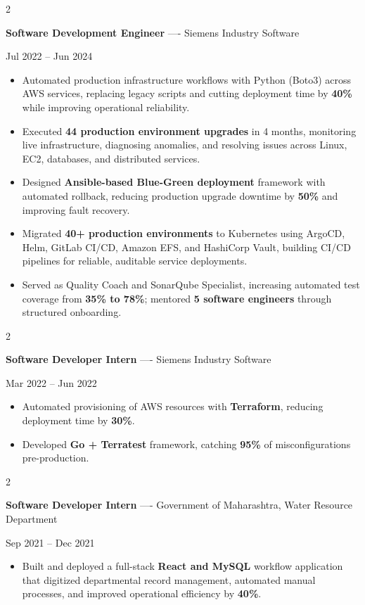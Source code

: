 \documentclass[10pt, letterpaper]{article}
\newenvironment{highlights}{
    \begin{itemize}[
        topsep=0.10 cm,
        parsep=0.06 cm,
        partopsep=0pt,
        itemsep=0.06 cm,
        leftmargin=12pt
    ]
}{
    \end{itemize}
}
\newenvironment{twocolentry}[2][]{
    \onecolentry
    \def\secondColumn{#2}
    \setcolumnwidth{\fill, 4.5 cm}
    \begin{paracol}{2}
}{
    \switchcolumn \raggedleft \secondColumn
    \end{paracol}
    \endonecolentry
}
\begin{document}
\vspace{0.15 cm}

\begin{twocolentry}{Jul 2022 -- Jun 2024}
\textbf{Software Development Engineer} ---- Siemens Industry Software
\end{twocolentry}
\begin{highlights}
  \item Automated production infrastructure workflows with Python (Boto3) across AWS services, replacing legacy scripts and cutting deployment time by \textbf{40\%} while improving operational reliability.
  \item Executed \textbf{44 production environment upgrades} in 4 months, monitoring live infrastructure, diagnosing anomalies, and resolving issues across Linux, EC2, databases, and distributed services.
  \item Designed \textbf{Ansible-based Blue-Green deployment} framework with automated rollback, reducing production upgrade downtime by \textbf{50\%} and improving fault recovery.
  \item Migrated \textbf{40+ production environments} to Kubernetes using ArgoCD, Helm, GitLab CI/CD, Amazon EFS, and HashiCorp Vault, building CI/CD pipelines for reliable, auditable service deployments.
  \item Served as Quality Coach and SonarQube Specialist, increasing automated test coverage from \textbf{35\% to 78\%}; mentored \textbf{5 software engineers} through structured onboarding.
\end{highlights}

\vspace{0.15 cm}

\begin{twocolentry}{Mar 2022 -- Jun 2022}
\textbf{Software Developer Intern} ---- Siemens Industry Software
\end{twocolentry}
\begin{highlights}
  \item Automated provisioning of AWS resources with \textbf{Terraform}, reducing deployment time by \textbf{30\%}.
  \item Developed \textbf{Go + Terratest} framework, catching \textbf{95\%} of misconfigurations pre-production.
\end{highlights}

\vspace{0.15 cm}

\begin{twocolentry}{Sep 2021 -- Dec 2021}
\textbf{Software Developer Intern} ---- Government of Maharashtra, Water Resource Department
\end{twocolentry}
\begin{highlights}
  \item Built and deployed a full-stack \textbf{React and MySQL} workflow application that digitized departmental record management, automated manual processes, and improved operational efficiency by \textbf{40\%}.
\end{highlights}
\end{document}
